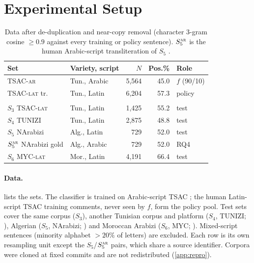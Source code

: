 \section{Experimental Setup}
\label{sec:setup}

\begin{table}[t]
\centering\small
\setlength{\tabcolsep}{3pt}
\begin{tabular}{@{}llrrl@{}}
\toprule
Set & Variety, script & $N$ & Pos.\% & Role\\
\midrule
TSAC-\textsc{ar} & Tun., Arabic & 5{,}564 & 45.0 & $f$ (90/10)\\
TSAC-\textsc{lat} tr. & Tun., Latin & 6{,}204 & 57.3 & policy\\\\
\midrule
$S_3$ TSAC-\textsc{lat} & Tun., Latin & 1{,}425 & 55.2 & test\\
$S_4$ TUNIZI & Tun., Latin & 2{,}875 & 48.8 & test\\
$S_5$ NArabizi & Alg., Latin & 729 & 52.0 & test\\
$S_5^{\textsc{ar}}$ NArabizi gold & Alg., Arabic & 729 & 52.0 & RQ4\\
$S_6$ MYC-\textsc{lat} & Mor., Latin & 4{,}191 & 66.4 & test\\
\bottomrule
\end{tabular}
\caption{Data after de-duplication and near-copy removal (character 3-gram cosine $\ge0.9$ against every training or policy sentence). $S_5^{\textsc{ar}}$ is the human Arabic-script transliteration of $S_5$ \citep{touileb2021interplay}.}
\label{tab:data}
\end{table}

\paragraph{Data.}
 lists the sets. The classifier is trained on Arabic-script TSAC \citep{medhaffar2017tsac}; the human Latin-script TSAC training comments, never seen by $f$, form the policy pool. Test sets cover the same corpus ($S_3$), another Tunisian corpus and platform ($S_4$, TUNIZI; \citealp{fourati2021tunizi}), Algerian ($S_5$, NArabizi; \citealp{seddah2020narabizi,touileb2021interplay}) and Moroccan Arabizi ($S_6$, MYC; \citealp{jbel2023myc}). Mixed-script sentences (minority alphabet $>20\%$ of letters) are excluded. Each row is its own resampling unit except the $S_5$/$S_5^{\textsc{ar}}$ pairs, which share a source identifier. Corpora were cloned at fixed commits and are not redistributed (\cref{app:repro}).

